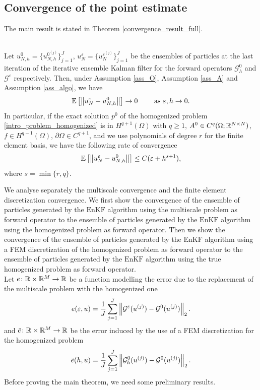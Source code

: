 \documentclass[10pt]{article}
\begin{document}
\subsection{Convergence of the point estimate}

The main result is stated in Theorem \ref{convergence_result_full}.
\begin{theorem}
\label{convergence_result_full}
\leavevmode \\
Let $u_{N,h}^0 = \{ u_{N,h}^{0^{(j)}} \}_{j=1}^J$, $u_N^{\varepsilon} = \{ u_N^{\varepsilon^{(j)}} \}_{j=1}^J$ be the ensembles of particles at the last iteration of the iterative ensemble Kalman filter for the forward operators $\mathcal{G}^0_h$ and $\mathcal{G}^{\varepsilon}$ respectively. 
Then, under Assumption \ref{ass_O}, Assumption \ref{ass_A} and Assumption \ref{ass_algo}, we have
\begin{equation*}
\mathbb{E} \left [ \left\|u_N^{\varepsilon} - u_{N,h}^0\right\| \right ] \to 0 \qquad \text{ as } \varepsilon, h \to 0.
\end{equation*}
In particular, if the exact solution $p^0$ of the homogenized problem \eqref{intro_problem_homogenized} is in $H^{q+1}(\Omega)$ with $q \ge 1$, $A^0 \in C^q(\Omega;\mathbb{R}^{N \times N})$, $f \in H^{q-1}(\Omega)$, $\partial \Omega \in C^{q+1}$, and we use polynomials of degree $r$ for the finite element basis, we have the following rate of convergence
\begin{equation*}
\mathbb{E} \left [ \left\|u_N^{\varepsilon} - u_{N,h}^0\right\| \right ] \le C ( \varepsilon + h^{s+1} ),
\end{equation*} 
where $s = \min \{ r, q \}$.
\end{theorem}

We analyse separately the multiscale convergence and the finite element discretization convergence. We first show the convergence of the ensemble of particles generated by the $\mathrm{EnKF}$ algorithm using the multiscale problem as forward operator to the ensemble of particles generated by the $\mathrm{EnKF}$ algorithm using the homogenized problem as forward operator. Then we show the convergence of the ensemble of particles generated by the $\mathrm{EnKF}$ algorithm using a FEM discretization of the homogenized problem as forward operator to the ensemble of particles generated by the $\mathrm{EnKF}$ algorithm using the true homogenized problem as forward operator. \\
Let $e \colon \mathbb{R} \times \mathbb{R}^M \to \mathbb{R}$ be a function modelling the error due to the replacement of the multiscale problem with the homogenized one
\begin{equation}
\label{e}
e(\varepsilon, u) = \frac{1}{J} \sum_{j=1}^J \left\|\mathcal{G}^{\varepsilon}(u^{(j)}) - \mathcal{G}^0(u^{(j)})\right\|_2.
\end{equation}
and $\tilde{e} \colon \mathbb{R} \times \mathbb{R}^M \to \mathbb{R}$ be the error induced by the use of a FEM discretization for the homogenized problem
\begin{equation}
\label{e_tilde}
\tilde{e}(h, u) = \frac{1}{J} \sum_{j=1}^J \left\|\mathcal{G}^0_h(u^{(j)}) - \mathcal{G}^0(u^{(j)})\right\|_2.
\end{equation}
Before proving the main theorem, we need some preliminary results.
\end{document}
